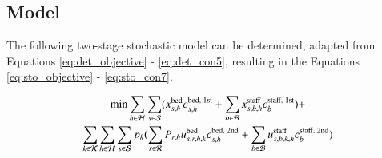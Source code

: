 \documentclass[../thesis.tex]{subfiles}
\begin{document}
{%

\subsection{Model}
The following two-stage stochastic model can be determined, adapted from Equations \eqref{eq:det_objective} - \eqref{eq:det_con5}, resulting in the Equations \eqref{eq:sto_objective} - \eqref{eq:sto_con7}.

\begin{multline}\label{eq:sto_objective}
    \text{min} \sum_{h\in\mathcal{H}}\sum_{s\in\mathcal{S}}(x^\textnormal{bed}_{s,h}c^\textnormal{bed, 1st}_{s,h} + \sum_{b\in\mathcal{B}}x^\textnormal{staff}_{s,b,h}c^\textnormal{staff, 1st}_{b}) +\\ 
    \sum_{k\in\mathcal{K}}\sum_{h\in\mathcal{H}}\sum_{s\in\mathcal{S}}p_{k}(\sum_{r\in\mathcal{R}} P_{r,h} u^\textnormal{bed}_{s,r,h,k}c^\textnormal{bed, 2nd}_{s,h} +
   \sum_{b\in\mathcal{B}} u^\textnormal{staff}_{s,b,k,h}c^\textnormal{staff, 2nd}_{b})
\end{multline}


}
\end{document}
